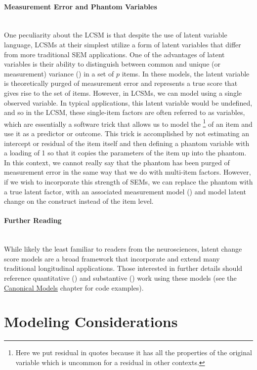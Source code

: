 \documentclass[11pt]{article}
\newcommand{\subsubsubsection}[1]{\paragraph{#1}\mbox{}\\}  %
\begin{document}
\subsubsubsection{Measurement Error and Phantom Variables}
One peculiarity about the LCSM is that despite the use of latent variable language, LCSMs at their simplest utilize a form of latent variables that differ from more traditional SEM applications. One of the advantages of latent variables is their ability to distinguish between common and unique (or measurement) variance (\cite{bollen_latent_2002}) in a set of $p$ items. In these models, the latent variable is theoretically purged of measurement error and represents a true score that gives rise to the set of items. However, in LCSMs, we can model  using a single observed variable. In typical applications, this latent variable would be undefined, and so in the LCSM, these single-item factors are often referred to as  variables, which are essentially a software trick that allows us to model the \footnote{Here we put residual in quotes because it has all the properties of the original variable which is uncommon for a residual in other contexts.} of an item and use it as a predictor or outcome. This trick is accomplished by not estimating an intercept or residual of the item itself and then defining a phantom variable with a loading of 1 so that it copies the parameters of the item up into the phantom. In this context, we cannot really say that the phantom has been purged of measurement error in the same way that we do with multi-item factors. However, if we wish to incorporate this strength of SEMs, we can replace the phantom with a true latent factor, with an associated measurement model (\cite{ferrer_factorial_2008}) and model latent change on the construct instead of the item level.

\subsubsubsection{Further Reading}
While likely the least familiar to readers from the neurosciences, latent change score models are a broad framework that incorporate and extend many traditional longitudinal applications. Those interested in further details should reference quantitative (\cite{grimm_intercept_2012,grimm_recent_2012,mcardle_latent_2009,mcardle_modeling_2009,ram_using_2007}) and substantive  (\cite{ferrer_longitudinal_2007,mcardle_latent_2008,selig_mediation_2009}) work using these models (see the \href{https://e-m-mccormick.github.io/static/longitudinal-primer/02-canonical.html#latent-change-score-model}{Canonical Models} chapter for code examples).

\section{Modeling Considerations}
\end{document}
